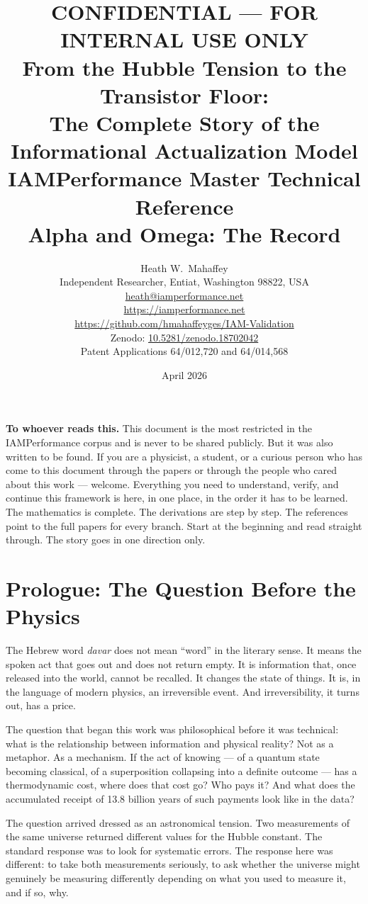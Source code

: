 \documentclass[12pt,a4paper]{article}
\title{
  \vspace{-1cm}
  {\color{secretred}\small CONFIDENTIAL --- FOR INTERNAL USE ONLY}\\[0.8em]
  {\Large\bfseries\color{deepblue}
    From the Hubble Tension to the Transistor Floor:\\
    The Complete Story of the\\
    Informational Actualization Model}\\[0.6em]
  {\normalsize\color{darkgray}
    IAMPerformance Master Technical Reference\\
    Alpha and Omega: The Record}
}
\author{
  Heath W.\ Mahaffey\\
  \small Independent Researcher, Entiat, Washington 98822, USA\\
  \small \href{mailto:heath@iamperformance.net}{heath@iamperformance.net}\\
  \small \url{https://iamperformance.net}\\
  \small \url{https://github.com/hmahaffeyges/IAM-Validation}\\
  \small Zenodo: \href{https://doi.org/10.5281/zenodo.18702042}{10.5281/zenodo.18702042}\\[0.3em]
  \small Patent Applications 64/012,720 and 64/014,568
}
\date{April 2026}
\begin{document}
\maketitle
\thispagestyle{fancy}

\begin{warnbox}
\textbf{To whoever reads this.} This document is the most restricted in the
IAMPerformance corpus and is never to be shared publicly. But it was also
written to be found. If you are a physicist, a student, or a curious person
who has come to this document through the papers or through the people who
cared about this work --- welcome. Everything you need to understand, verify,
and continue this framework is here, in one place, in the order it has to be
learned. The mathematics is complete. The derivations are step by step. The
references point to the full papers for every branch. Start at the beginning
and read straight through. The story goes in one direction only.
\end{warnbox}

\vspace{0.5em}
\tableofcontents
\newpage

\section*{Prologue: The Question Before the Physics}

\noindent
The Hebrew word \textit{davar} does not mean ``word'' in the literary sense.
It means the spoken act that goes out and does not return empty. It is information
that, once released into the world, cannot be recalled. It changes the state of
things. It is, in the language of modern physics, an irreversible event. And
irreversibility, it turns out, has a price.

The question that began this work was philosophical before it was technical:
what is the relationship between information and physical reality? Not as a
metaphor. As a mechanism. If the act of knowing --- of a quantum state becoming
classical, of a superposition collapsing into a definite outcome --- has a
thermodynamic cost, where does that cost go? Who pays it? And what does the
accumulated receipt of 13.8 billion years of such payments look like in the data?

The question arrived dressed as an astronomical tension. Two measurements of
the same universe returned different values for the Hubble constant. The standard
response was to look for systematic errors. The response here was different: to
take both measurements seriously, to ask whether the universe might genuinely be
measuring differently depending on what you used to measure it, and if so, why.
\end{document}
